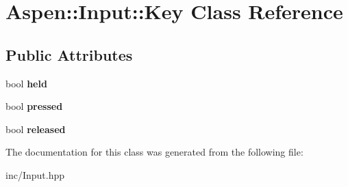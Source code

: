 \hypertarget{class_aspen_1_1_input_1_1_key}{\section{Aspen\-:\-:Input\-:\-:Key Class Reference}
\label{class_aspen_1_1_input_1_1_key}
}
\subsection*{Public Attributes}
\begin{DoxyCompactItemize}
\item 
\hypertarget{class_aspen_1_1_input_1_1_key_aaa91fee2391f8dbf66eb14e069f2b84b}{bool {\bfseries held}}\label{class_aspen_1_1_input_1_1_key_aaa91fee2391f8dbf66eb14e069f2b84b}

\item 
\hypertarget{class_aspen_1_1_input_1_1_key_a9ff4633c508f52c4f9e966698dbda833}{bool {\bfseries pressed}}\label{class_aspen_1_1_input_1_1_key_a9ff4633c508f52c4f9e966698dbda833}

\item 
\hypertarget{class_aspen_1_1_input_1_1_key_a7e7572c54eb941dac3359c69f35a34d0}{bool {\bfseries released}}\label{class_aspen_1_1_input_1_1_key_a7e7572c54eb941dac3359c69f35a34d0}

\end{DoxyCompactItemize}


The documentation for this class was generated from the following file\-:\begin{DoxyCompactItemize}
\item 
inc/Input.\-hpp\end{DoxyCompactItemize}

